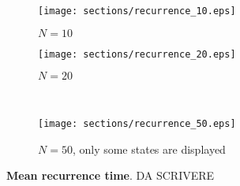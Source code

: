 \begin{figure}
  \begin{subfigure}{.5\textwidth}
      \centering
      \texttt{[image: sections/recurrence\_10.eps]}
      \caption{$N = 10$}
    \end{subfigure}
    \begin{subfigure}{.5\textwidth}
      \centering
      \texttt{[image: sections/recurrence\_20.eps]}
      \caption{$N = 20$}
    \end{subfigure}\\
    \begin{center}
    \begin{subfigure}{0.5\textwidth}
      \centering
      \texttt{[image: sections/recurrence\_50.eps]}
      \caption{$N = 50$, only some states are displayed}
    \end{subfigure}%
  \end{center}

  \captionsetup{width=.9\linewidth}
  \caption{\textbf{Mean recurrence time}. DA SCRIVERE}
  \label{fig:recurrence}
\end{figure}



